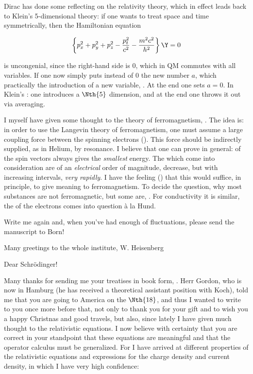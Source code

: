 \documentclass{article}
\newcommand{\uequ}[1]{
\begin{align*}
#1
\end{align*}
}
\begin{document}
Dirac has done some reflecting on the relativity theory, which in effect leads back to Klein's 5-dimensional theory: if one wants to treat space and time symmetrically, then the Hamiltonian equation
\uequ{
\left\{
p_x^2 + p_y^2 + p_z^2 - \frac{p_t^2}{c^2} - \frac{m^2 c^2}{h^2}
\right\}\Y = 0
}
is uncongenial, since the right-hand side is 0, which in QM commutes with all variables. If one now simply puts instead of 0 the new number $a$, which practically  the introduction of a new variable, . At the end one sets $a=0$. In Klein's : one introduces a $\Nth{5}$ dimension, and at the end one throws it out via averaging.

I myself have given some thought to the theory of ferromagnetism, . The idea is: in order to use the Langevin theory of ferromagnetism, one must assume a large coupling force between the spinning electrons (). This force should be indirectly supplied, as in Helium, by resonance. I believe that one can prove in general:  of the spin vectors always gives the \textit{smallest} energy. The  which come into consideration are of an \textit{electrical} order of magnitude, decrease, but with increasing intervals, \textit{very rapidly}. I have the feeling () that this would suffice, in principle, to give meaning to ferromagnetism. To decide the question, why most substances are not ferromagnetic, but some are, . For conductivity it is similar, the  of the electrons comes into question \`a la Hund.

Write me again and, when you've had enough of fluctuations, please send the manuscript to Born!

Many greetings to the whole institute,
W. Heisenberg

\date{December 12, 1926}

Dear Schr\"odinger!

Many thanks for sending me your treatises in book form, . Herr Gordon, who is now in Hamburg (he has received a theoretical assistant position with Koch), told me that you are going to America on the $\Nth{18}$, and thus I wanted to write to you once more before that, not only to thank you for your gift and to wish you a happy Christnas and good travels, but also, since lately I have given much thought to the relativistic equations. I now believe with certainty that you are correct in your standpoint that these equations are meaningful and that the operator calculus must be generalized. For I have arrived at different properties of the relativistic equations and expressions for the charge density and current density, in which I have very high confidence:
\end{document}
